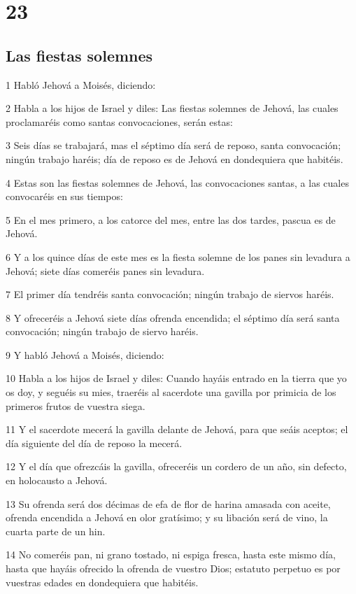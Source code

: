 \chapter{23}

\section*{Las fiestas solemnes}

\par 1 Habló Jehová a Moisés, diciendo:
\par 2 Habla a los hijos de Israel y diles: Las fiestas solemnes de Jehová, las cuales proclamaréis como santas convocaciones, serán estas:
\par 3 Seis días se trabajará, mas el séptimo día será de reposo, santa convocación; ningún trabajo haréis; día de reposo es de Jehová en dondequiera que habitéis.
\par 4 Estas son las fiestas solemnes de Jehová, las convocaciones santas, a las cuales convocaréis en sus tiempos:
\par 5 En el mes primero, a los catorce del mes, entre las dos tardes, pascua es de Jehová.
\par 6 Y a los quince días de este mes es la fiesta solemne de los panes sin levadura  a Jehová; siete días comeréis panes sin levadura.
\par 7 El primer día tendréis santa convocación; ningún trabajo de siervos haréis.
\par 8 Y ofreceréis a Jehová siete días ofrenda encendida; el séptimo día será santa convocación; ningún trabajo de siervo haréis.
\par 9 Y habló Jehová a Moisés, diciendo:
\par 10 Habla a los hijos de Israel y diles: Cuando hayáis entrado en la tierra que yo os doy, y seguéis su mies, traeréis al sacerdote una gavilla por primicia de los primeros frutos de vuestra siega.
\par 11 Y el sacerdote mecerá la gavilla delante de Jehová, para que seáis aceptos; el día siguiente del día de reposo la mecerá.
\par 12 Y el día que ofrezcáis la gavilla, ofreceréis un cordero de un año, sin defecto, en holocausto a Jehová.
\par 13 Su ofrenda será dos décimas de efa   de flor de harina amasada con aceite, ofrenda encendida a Jehová en olor gratísimo; y su libación será de vino, la cuarta parte de un hin.
\par 14 No comeréis pan, ni grano tostado, ni espiga fresca, hasta este mismo día, hasta que hayáis ofrecido la ofrenda de vuestro Dios; estatuto perpetuo es por vuestras edades en dondequiera que habitéis.
